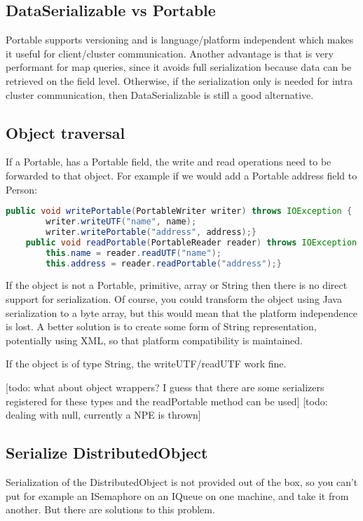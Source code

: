 \subsection{DataSerializable vs Portable}
Portable supports versioning and is language/platform independent which makes it useful for client/cluster communication. Another advantage is that is very performant for map queries, since it avoids full serialization because data can be retrieved on the field level. Otherwise, if the serialization only is needed for intra cluster communication, then DataSerializable is still a good alternative.

\subsection*{Object traversal}
If a Portable, has a Portable field, the write and read operations need to be forwarded to that object. For example if we would add a Portable address field to Person:
\begin{lstlisting}[language=java]
    public void writePortable(PortableWriter writer) throws IOException {
        writer.writeUTF("name", name);
        writer.writePortable("address", address);}
    public void readPortable(PortableReader reader) throws IOException {
        this.name = reader.readUTF("name");
        this.address = reader.readPortable("address");}
\end{lstlisting}

If the object is not a Portable, primitive, array or String then there is no direct support for serialization. Of course, you could transform the object using Java serialization to a byte array, but this would mean that the platform independence is lost. A better solution  is to create some form of String representation, potentially using XML, so that platform compatibility is maintained.

If the object is of type String, the writeUTF/readUTF work fine. 

[todo: what about object wrappers? I guess that there are some serializers registered for these types and the readPortable method can be used]
[todo: dealing with null, currently a NPE is thrown]

\subsection*{Serialize DistributedObject}
Serialization of the DistributedObject is not provided out of the box, so you can't put for example an ISemaphore on an IQueue on one machine, and take it from another. But there are solutions to this problem.


